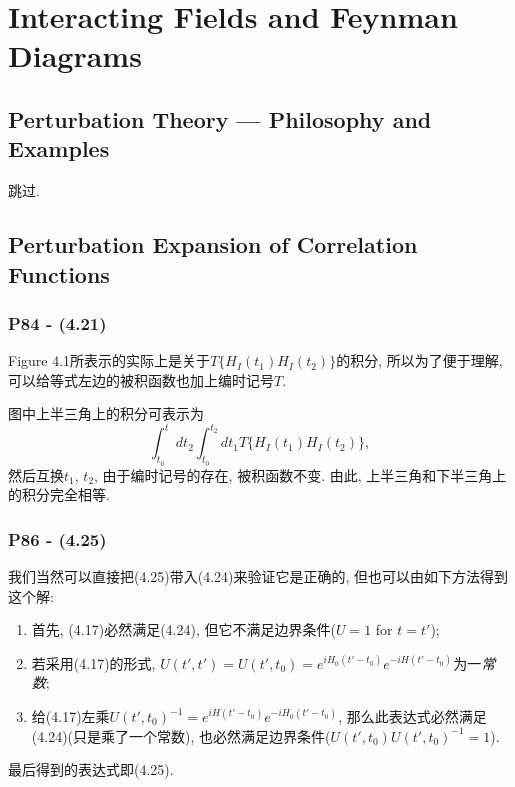 \documentclass[10pt,b5paper,openany]{book}
\begin{document}
\clearpage

\chapter{Interacting Fields and Feynman Diagrams}

\section{Perturbation Theory --- Philosophy and Examples}

跳过. 

\section{Perturbation Expansion of Correlation Functions}

\subsection{P84 - (4.21)}

Figure 4.1所表示的实际上是关于$T\{H_I(t_1) H_I(t_2)\}$的积分, 所以为了便于理解, 可以给等式左边的被积函数也加上编时记号$T$. 

图中上半三角上的积分可表示为
\begin{equation}
  \int_{t_0}^{t} dt_2 \int_{t_0}^{t_2} dt_1 T\{H_I(t_1) H_I(t_2)\}, 
\end{equation}
然后互换$t_1$, $t_2$, 由于编时记号的存在, 被积函数不变. 由此, 上半三角和下半三角上的积分完全相等. 

\begin{center}
\end{center}

\subsection{P86 - (4.25)}

我们当然可以直接把(4.25)带入(4.24)来验证它是正确的, 但也可以由如下方法得到这个解: 
\begin{enumerate}
  \item 首先, (4.17)必然满足(4.24), 但它不满足边界条件($U = 1$ for $t = t'$); 
  \item 若采用(4.17)的形式, $U(t', t') = U(t', t_0) = e^{iH_0(t'-t_0)}e^{-iH(t'-t_0)}$为一\textit{常数}; 
  \item 给(4.17)左乘$U(t', t_0)^{-1} = e^{iH(t'-t_0)}e^{-iH_0(t'-t_0)}$, 那么此表达式必然满足(4.24)(只是乘了一个常数), 也必然满足边界条件($U(t', t_0)U(t', t_0)^{-1} = 1$). 
\end{enumerate}
最后得到的表达式即(4.25). 
\end{document}
